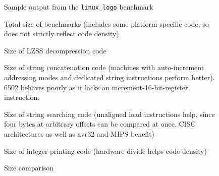 \documentclass{article}[10pt]
\begin{document}
\begin{figure}[tbp]
  \centering
  \caption{Sample output from the {\tt linux\_logo} benchmark}
  \label{figure:ll}
\end{figure}

%
%

\noindent




\begin{figure}[tbp]
  \centering
  \caption{Total size of benchmarks 
           (includes some platform-specific code, so does not
           strictly reflect code density)}
  \label{figure:total}
\end{figure}

\begin{figure}[tbp]
  \centering
  \caption{Size of LZSS decompression code}
  \label{figure:decomp}
\end{figure}

\begin{figure}[tbp]
  \centering
  \caption{Size of string concatenation code (machines with 
           auto-increment addressing modes and dedicated
           string instructions perform better). 6502 behaves poorly as it
           lacks an increment-16-bit-register instruction.}
  \label{figure:strcat}
\end{figure}

\begin{figure}[tbp]
  \centering
  \caption{Size of string searching code (unaligned load
           instructions help, since four bytes at arbitrary offsets 
           can be compared at once.  
           CISC architectures as well as avr32 and MIPS benefit)}
  \label{figure:findstring}
\end{figure}

\begin{figure}[tbp]
  \centering
  \caption{Size of integer printing code (hardware
           divide helps code density)}
  \label{figure:numascii}
\end{figure}

\begin{figure}[tbp]
  \centering
  \caption{Size comparison}
  \label{figure:libc}
\end{figure}

{


}
\end{document}
